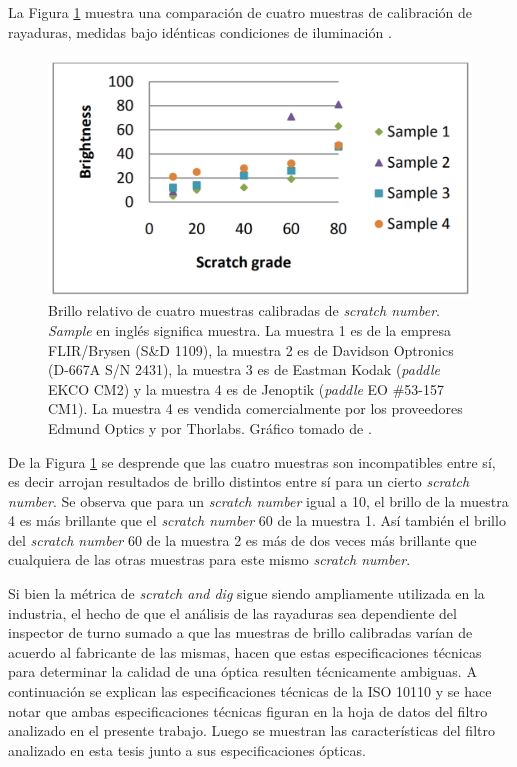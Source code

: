 La Figura \ref{fig:samplescratchs} muestra una comparación de cuatro muestras de calibración de rayaduras, medidas bajo idénticas condiciones de iluminación \cite{Aikens}.
\begin{figure}[H]
	\centering
	\includegraphics[scale=0.8]{Figs/cuantificaciondefectos/samplesscratch.png}
	\caption{Brillo relativo de cuatro muestras calibradas de \textit{scratch number}. \textit{Sample} en inglés significa muestra. La muestra 1 es de la empresa FLIR/Brysen (S\&D 1109), la muestra 2 es de Davidson Optronics (D-667A S/N 2431), la muestra 3 es de Eastman Kodak (\textit{paddle} EKCO CM2) y la muestra 4 es de Jenoptik (\textit{paddle} EO \#53-157 CM1). La muestra 4 es vendida comercialmente por los proveedores Edmund Optics y por Thorlabs. Gráfico tomado de \cite{Aikens}.}
	\label{fig:samplescratchs}
\end{figure}


De la Figura \ref{fig:samplescratchs} se desprende que las cuatro muestras son incompatibles entre sí, es decir arrojan resultados de brillo distintos entre sí para un cierto \textit{scratch number}. Se observa que para un \textit{scratch number} igual a 10, el brillo de la muestra 4 es más brillante que el \textit{scratch number} 60 de la muestra 1.
Así también el brillo del \textit{scratch number} 60 de la muestra 2 es más de dos veces más brillante que cualquiera de las otras muestras para este mismo \textit{scratch number}. 

Si bien la métrica de \textit{scratch and dig} sigue siendo ampliamente utilizada en la industria, el hecho de que el análisis de las rayaduras sea dependiente del inspector de turno sumado a que las muestras de brillo calibradas varían de acuerdo al fabricante de las mismas, hacen que estas especificaciones técnicas para determinar la calidad de una óptica resulten técnicamente ambiguas. A continuación se explican las especificaciones técnicas de la ISO 10110 y se hace notar que ambas especificaciones técnicas figuran en la hoja de datos del filtro analizado en el presente trabajo. Luego se muestran las características del filtro analizado en esta tesis junto a sus especificaciones ópticas.

